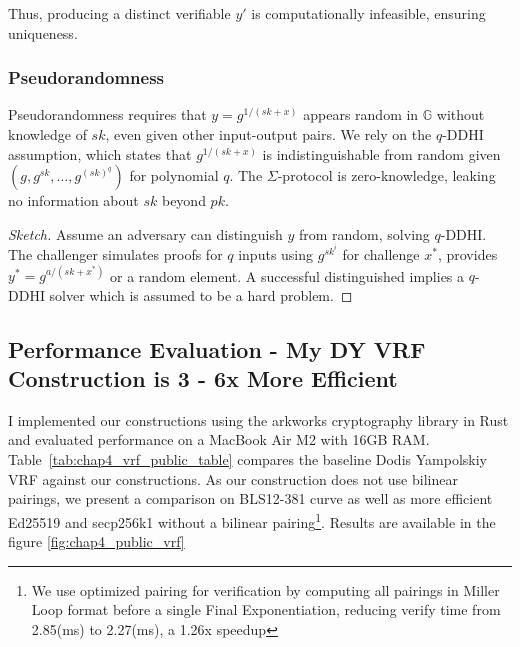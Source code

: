 Thus, producing a distinct verifiable $y'$ is computationally infeasible, ensuring uniqueness.

\subsubsection{Pseudorandomness}

Pseudorandomness requires that $y = g^{1/(sk + x)}$ appears random in $\mathbb{G}$ without knowledge of $sk$, even given other input-output pairs. We rely on the $q$-DDHI assumption, which states that $g^{1/(sk + x)}$ is indistinguishable from random given $(g, g^{sk}, \ldots, g^{(sk)^q})$ for polynomial $q$. 
The $\Sigma$-protocol is zero-knowledge, leaking no information about $sk$ beyond $pk$.

\begin{proof}[Sketch]
    Assume an adversary can distinguish $y$ from random, solving $q$-DDHI. The challenger simulates proofs for $q$ inputs using $g^{sk^i}$ for challenge $x^*$, provides $y^* = g^{a/(sk + x^*)}$ or a random element. A successful distinguished implies a $q$-DDHI solver which is assumed to be a hard problem.
\end{proof}


\subsection{Performance Evaluation - My DY VRF Construction is 3 - 6x More Efficient}

I implemented our constructions \cite{polgar_anonymous_2025} using the arkworks cryptography library \cite{arkworks_contributors_arkworks_2022} in Rust and evaluated performance on a MacBook Air M2 with 16GB RAM. Table~\ref{tab:chap4_vrf_public_table} compares the baseline Dodis Yampolskiy VRF against our constructions. As our construction does not use bilinear pairings, we present a comparison on BLS12-381 curve as well as more efficient Ed25519 and secp256k1 without a bilinear pairing\footnote{We use optimized pairing for verification by computing all pairings in Miller Loop format before a single Final Exponentiation, reducing verify time from 2.85(ms) to 2.27(ms), a 1.26x speedup}. Results are available in the figure \ref{fig:chap4_public_vrf}

